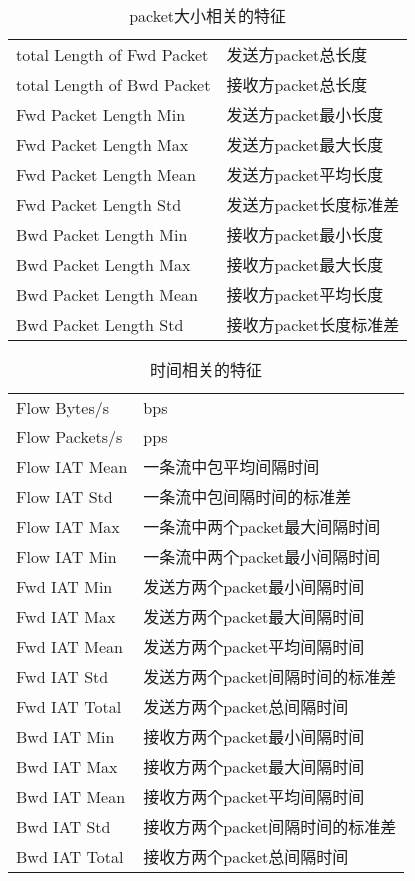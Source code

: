 \begin{table}[H]
    \caption{packet大小相关的特征}
    \centering
    \begin{tabular}{|l|l|}
    \hline
    total Length of Fwd Packet	& 发送方packet总长度 \\
    total Length of Bwd Packet	& 接收方packet总长度 \\
    Fwd Packet Length Min 		& 发送方packet最小长度 \\
    Fwd Packet Length Max 		& 发送方packet最大长度 \\
    Fwd Packet Length Mean		& 发送方packet平均长度 \\
    Fwd Packet Length Std		& 发送方packet长度标准差 \\
    Bwd Packet Length Min		& 接收方packet最小长度 \\
    Bwd Packet Length Max		& 接收方packet最大长度 \\
    Bwd Packet Length Mean		& 接收方packet平均长度 \\
    Bwd Packet Length Std		& 接收方packet长度标准差 \\
    \hline
    \end{tabular}
    \end{table}

\begin{table}[H]
    \caption{时间相关的特征}
    \centering
    \begin{tabular}{|l|l|}
    \hline
    Flow Bytes/s		&	bps \\
    Flow Packets/s		&	pps  \\
    Flow IAT Mean		&	一条流中包平均间隔时间 \\
    Flow IAT Std		&	一条流中包间隔时间的标准差 \\
    Flow IAT Max		&	一条流中两个packet最大间隔时间 \\
    Flow IAT Min		&	一条流中两个packet最小间隔时间 \\
    Fwd IAT Min			&发送方两个packet最小间隔时间\\
    Fwd IAT Max			&发送方两个packet最大间隔时间 \\
    Fwd IAT Mean		&	发送方两个packet平均间隔时间 \\
    Fwd IAT Std			&发送方两个packet间隔时间的标准差 \\
    Fwd IAT Total   	&	发送方两个packet总间隔时间\\
    Bwd IAT Min			&接收方两个packet最小间隔时间\\
    Bwd IAT Max			&接收方两个packet最大间隔时间\\
    Bwd IAT Mean		&	接收方两个packet平均间隔时间 \\
    Bwd IAT Std			&接收方两个packet间隔时间的标准差 \\
    Bwd IAT Total		&	接收方两个packet总间隔时间 \\  
    \hline
    \end{tabular}
    \end{table}

